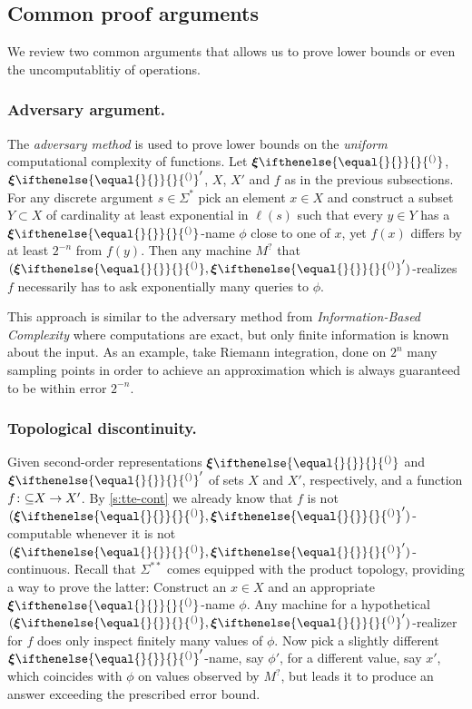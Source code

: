 \documentclass{CSML}
\newcommand{\representation}[2]{ #1\ifnotempty{#2}{^{(#2)}} }
\newcommand{\len}[1]{\ell(#1)}
\newcommand{\parcol}{\colon\mathnormal\subseteq}
\newcommand{\Sast}{\Sigma^\ast}
\newcommand{\Baire}{\Sigma^{\ast\ast}}
\newcommand{\reptpl}[1][\empty]{ \representation{\bm{\xi}}{#1} }
\newcommand{\ifnotempty}[2]{ \ifthenelse{ \equal{#1}{\empty} }{}{#2} }
\begin{document}
\subsection{Common proof arguments}
	\label{sec:proof-techniques}


We review two common arguments that allows us to prove lower bounds or
even the uncomputablitiy of operations.


\subsubsection{Adversary argument.} \label{sec:adversary-method}


The \emph{adversary method} is used to prove lower bounds on the \emph{uniform}
computational complexity of functions.
%
Let $\reptpl$, $\reptpl'$, $X$, $X'$ and $f$ as in the previous subsections.
For any discrete argument $s \in \Sast$ pick an element $x \in X$ and construct
a subset $Y \subset X$ of cardinality at least exponential in $\len{s}$
such that every $y \in Y$ has a $\reptpl$-name $\phi$ close to one of $x$,
yet $f(x)$ differs by at least $2^{-n}$ from $f(y)$.
Then any machine $M^?$ that $(\reptpl,\reptpl')$-realizes $f$ necessarily has to
ask exponentially many queries to $\phi$.

This approach is similar to the adversary method from \emph{Information-Based
Complexity} \cite{IBC} where computations are exact, but only finite
information is known about the input. As an example, take Riemann
integration, done on $2^n$ many sampling points in order to achieve an
approximation which is always guaranteed to be within error $2^{-n}$.


\subsubsection{Topological discontinuity.}


Given second-order representations $\reptpl$ and $\reptpl'$ of sets $X$ and
$X'$, respectively, and a function $f \parcol X \to X'$. By \cref{s:tte-cont}
we already know that $f$ is not $(\reptpl,\reptpl')$-computable whenever it is
not $(\reptpl,\reptpl')$-continuous. Recall that $\Baire$ comes equipped with
the product topology, providing a way to prove the latter:
Construct an $x \in X$ and an
appropriate $\reptpl$-name $\phi$. Any machine for a hypothetical
$(\reptpl,\reptpl')$-realizer for $f$ does only inspect finitely many values
of $\phi$. Now pick a slightly different $\reptpl'$-name, say $\phi'$, for a
different value, say $x'$, which coincides with $\phi$ on values observed by
$M^?$, but leads it to produce an answer exceeding the prescribed error bound.
\end{document}

